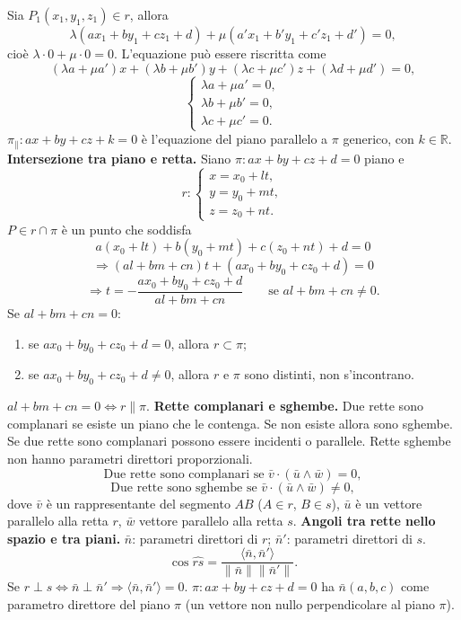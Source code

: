 \documentclass[11pt,a4paper]{article}
\newcommand{\pagina}[1]{\clearpage}
\begin{document}
Sia $P_1(x_1,y_1,z_1)\in r$, allora
\[\lambda(ax_1+by_1+cz_1+d)+\mu(a'x_1+b'y_1+c'z_1+d')=0,\]
cioè $\lambda\cdot0+\mu\cdot0=0$.
\pagina{65}
L'equazione può essere riscritta come
\[(\lambda a+\mu a')x+(\lambda b+\mu b')y+(\lambda c+\mu c')z+(\lambda d+\mu d')=0,\]
\[\begin{cases}\lambda a+\mu a'=0,\\\lambda b+\mu b'=0,\\\lambda c+\mu c'=0.\end{cases}\]
$\pi_{\parallel}:ax+by+cz+k=0$ è l'equazione del piano parallelo a $\pi$ generico, con $k\in\mathbb R$.
\textbf{Intersezione tra piano e retta.} Siano $\pi:ax+by+cz+d=0$ piano e
\[r:\begin{cases}x=x_0+lt,\\y=y_0+mt,\\z=z_0+nt.\end{cases}\]
$P\in r\cap\pi$ è un punto che soddisfa
\[a(x_0+lt)+b(y_0+mt)+c(z_0+nt)+d=0\]
\[\Longrightarrow(al+bm+cn)t+(ax_0+by_0+cz_0+d)=0\]
\[\Longrightarrow t=-\frac{ax_0+by_0+cz_0+d}{al+bm+cn}\qquad\text{se }al+bm+cn\ne0.\]
Se $al+bm+cn=0$:
\begin{enumerate}
\item se $ax_0+by_0+cz_0+d=0$, allora $r\subset\pi$;
\item se $ax_0+by_0+cz_0+d\ne0$, allora $r$ e $\pi$ sono distinti, non s'incontrano.
\end{enumerate}
$al+bm+cn=0\Longleftrightarrow r\parallel\pi$.
\pagina{66}
\textbf{Rette complanari e sghembe.} Due rette sono complanari se esiste un piano che le contenga. Se non esiste allora sono sghembe. Se due rette sono complanari possono essere incidenti o parallele.
Rette sghembe non hanno parametri direttori proporzionali.
\[\text{Due rette sono complanari se }\bar v\cdot(\bar u\wedge\bar w)=0,\]
\[\text{Due rette sono sghembe se }\bar v\cdot(\bar u\wedge\bar w)\ne0,\]
dove $\bar v$ è un rappresentante del segmento $AB$ ($A\in r$, $B\in s$), $\bar u$ è un vettore parallelo alla retta $r$, $\bar w$ vettore parallelo alla retta $s$.
\textbf{Angoli tra rette nello spazio e tra piani.}
$\bar n$: parametri direttori di $r$; $\bar n'$: parametri direttori di $s$.
\[\cos\widehat{rs}=\frac{\langle\bar n,\bar n'\rangle}{\|\bar n\|\|\bar n'\|}.\]
Se $r\perp s\Longleftrightarrow\bar n\perp\bar n'\Longrightarrow\langle\bar n,\bar n'\rangle=0$.
$\pi:ax+by+cz+d=0$ ha $\bar n(a,b,c)$ come parametro direttore del piano $\pi$ (un vettore non nullo perpendicolare al piano $\pi$).
\end{document}
